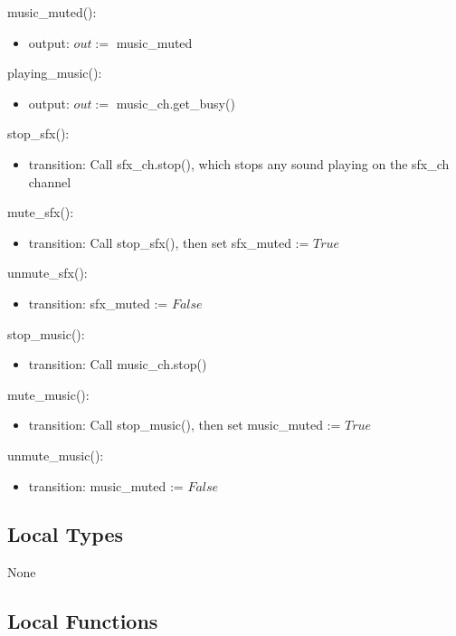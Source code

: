 \documentclass[12pt]{article}
\begin{document}
\noindent music\_muted():
\begin{itemize}
\item output: $out := $ music\_muted
\end{itemize}

\noindent playing\_music():
\begin{itemize}
\item output: $out := $ music\_ch.get\_busy()
\end{itemize}

\noindent stop\_sfx():
\begin{itemize}
\item transition: Call sfx\_ch.stop(), which stops any sound playing on the sfx\_ch channel
\end{itemize}

\noindent mute\_sfx():
\begin{itemize}
\item transition: Call stop\_sfx(), then set sfx\_muted := $True$
\end{itemize}

\noindent unmute\_sfx():
\begin{itemize}
\item transition: sfx\_muted := $False$
\end{itemize}

\noindent stop\_music():
\begin{itemize}
\item transition: Call music\_ch.stop()
\end{itemize}

\noindent mute\_music():
\begin{itemize}
\item transition: Call stop\_music(), then set music\_muted := $True$
\end{itemize}

\noindent unmute\_music():
\begin{itemize}
\item transition: music\_muted := $False$
\end{itemize}


\subsection* {Local Types}

None

\subsection* {Local Functions}
\end{document}
